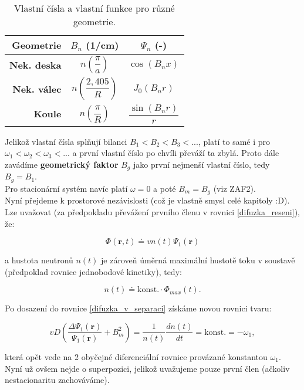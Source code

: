 \begin{table}[h]
\centering
\caption{Vlastní čísla a vlastní funkce pro různé geometrie.}
\label{table_vlastni_funkce}
\begin{tabular}{@{}rcc@{}}
\toprule
\textbf{Geometrie}   & $B_n$ (1/cm)         & $\Psi_n$ (-)                               \\ \midrule
\textbf{Nek. deska}  & $n \left ( \dfrac{\pi}{a} \right )$   & $\cos(B_nx)$              \\ [15pt]
\textbf{Nek. válec}  & $n \left ( \dfrac{2,405}{R} \right )$ & $J_0(B_nr)$               \\ [15pt]
\textbf{Koule}       & $n \left ( \dfrac{\pi}{R} \right )$   & $\dfrac{\sin(B_nr)}{r}$   \\ \bottomrule
\end{tabular}
\end{table}

Jelikož vlastní čísla splňují bilanci $B_1 < B_2 < B_3 < ...$, platí to samé i pro $\omega_1 < \omega_2 < \omega_3 < ...$ a první vlastní číslo po chvíli převáží ta zbylá. Proto dále zavádíme \textbf{geometrický faktor} $B_g$ jako první nejmenší vlastní číslo, tedy $B_g = B_1$.\\

Pro stacionární systém navíc platí $\omega = 0$ a poté $B_m = B_g$ (viz ZAF2).\\

Nyní přejdeme k prostorové nezávislosti (což je vlastně smysl celé kapitoly :D). Lze uvažovat (za předpokladu převážení prvního členu v rovnici \eqref{difuzka_reseni}), že:

$$ \Phi (\textbf{r}, t) \doteq v n(t) \Psi_1 (\textbf{r}) $$

a hustota neutronů $n(t)$ je zároveň úměrná maximální hustotě toku v soustavě (předpoklad rovnice jednobodové kinetiky), tedy:

$$ n(t) \doteq \text{konst.} \cdot \Phi_{max} (t). $$

Po dosazení do rovnice \eqref{difuzka_v_separaci} získáme novou rovnici tvaru:

\begin{equation}
  v D \left ( \dfrac{\Delta \Psi_1 (\textbf{r})}{\Psi_1 (\textbf{r})} + B_m^2 \right ) = \dfrac{1}{n(t)} \dfrac{d n(t)}{d t} = \text{konst.} = - \omega_1,
  \label{rovnice_kinetiky_v_separaci}
\end{equation}

která opět vede na 2 obyčejné diferenciální rovnice provázané konstantou $\omega_1$. Nyní už ovšem nejde o superpozici, jelikož uvažujeme pouze první člen (ačkoliv nestacionaritu zachováváme).\\

